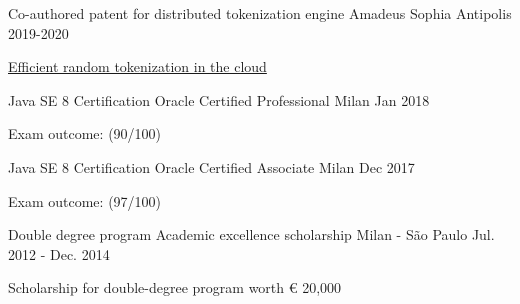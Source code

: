 


\begin{cventries}


  \cventry
  {Co-authored patent for distributed tokenization engine} %
  {Amadeus} %
  {Sophia Antipolis} %
  {2019-2020} %
  {
    \begin{cvitems} %
      \item {\href{https://patents.justia.com/inventor/rodrigo-broggi}{Efficient random tokenization in the cloud}}
    \end{cvitems}
  }

  \cventry
    {Java SE 8 Certification} %
    {Oracle Certified Professional} %
    {Milan} %
    {Jan 2018} %
    {
      \begin{cvitems} %
        \item {Exam outcome: (90/100)}
      \end{cvitems}
    }

  \cventry
    {Java SE 8 Certification} %
    {Oracle Certified Associate} %
    {Milan} %
    {Dec 2017} %
    {
      \begin{cvitems} %
        \item {Exam outcome: (97/100)}
      \end{cvitems}
    }


  \cventry
    {Double degree program} %
    {Academic excellence scholarship} %
    {Milan - São Paulo} %
    {Jul. 2012 - Dec. 2014} %
    {
      \begin{cvitems} %
        \item {Scholarship for double-degree program worth € 20,000}
      \end{cvitems}
    }

\end{cventries}
